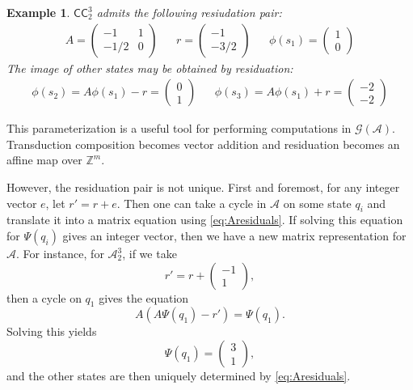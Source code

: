 \documentclass[12pt, letterpaper]{article}
\newcommand{\Z}{\mathbb Z}
\newcommand{\A}{\mathcal A}
\newcommand{\CC}{\mathsf{CC}}
\newcommand{\gp}{\mathcal G}
\newtheorem{example}[thm]{Example}
\begin{document}
\begin{example}
    $\CC^3_2$ admits the following resiudation pair:
    \begin{align*}
        A = \begin{pmatrix}
            -1 & 1\\
            -1/2 & 0
        \end{pmatrix}
        &&
        r = \begin{pmatrix}-1\\-3/2\end{pmatrix}
        &&
        \phi(s_1) = \begin{pmatrix} 1\\0 \end{pmatrix}
    \end{align*}
    The image of other states may be obtained by residuation:
    \begin{align*}
        \phi(s_2) = A \phi(s_1) - r = \begin{pmatrix}
            0\\
            1
        \end{pmatrix}
        &&
        \phi(s_3) = A \phi(s_1) + r = \begin{pmatrix}
            -2\\
            -2
        \end{pmatrix}
    \end{align*}
\end{example}

This parameterization is a useful tool for performing computations in
$\gp(\A)$. Transduction composition becomes vector addition and residuation
becomes an affine map over $\Z^m$.

However, the residuation pair is not unique. First and foremost, for any
integer vector $e$, let $r' = r + e$. Then one can take a cycle in $\A$ on
some state $q_i$ and translate it into a matrix equation using
\cref{eq:Aresiduals}. If solving this equation for $\Psi(q_i)$ gives an
integer vector, then we have a new matrix representation for $\A$. For
instance, for $\A^3_2$, if we take
\[
    r' = r + \begin{pmatrix}
        -1\\
        1
    \end{pmatrix},
\]
then a cycle on $q_1$ gives the equation
\[
    A (A\Psi(q_1) - r') = \Psi(q_1).
\]
Solving this yields
\[
    \Psi(q_1) = \begin{pmatrix}
        3\\
        1
    \end{pmatrix},
\]
and the other states are then uniquely determined by \cref{eq:Aresiduals}.
\end{document}
